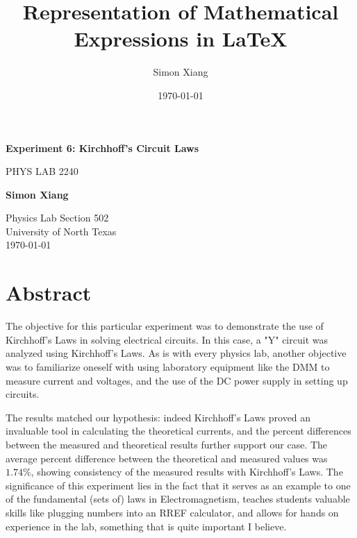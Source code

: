 \documentclass{article}
\title{Representation of Mathematical Expressions in \LaTeX}
\author{Simon Xiang}
\date{\today}
\begin{document}
\begin{titlepage}
    \begin{center}
        \vspace*{1cm}
 
        \Huge
        \textbf{Experiment 6: Kirchhoff's Circuit Laws}
 
        \vspace{0.5cm}
        \LARGE
        PHYS LAB 2240
 
        \vspace{1.5cm}
 
        \textbf{Simon Xiang}
 
        \vfill
  
        \vspace{0.8cm}
 
        \Large
        Physics Lab Section 502\\
        University of North Texas\\
        \today
 
    \end{center}
\end{titlepage}

\section{Abstract}
The objective for this particular experiment was to demonstrate the use of Kirchhoff's Laws in solving electrical circuits.
In this case, a "Y" circuit was analyzed using Kirchhoff's Laws. As is with every physics lab, another objective was to familiarize oneself
with using laboratory equipment like the DMM to measure current and voltages, and the use of the DC power supply in setting up circuits. 

The results matched our hypothesis: indeed Kirchhoff's Laws proved an invaluable tool in calculating the theoretical currents, and the percent differences
between the measured and theoretical results further support our case. The average percent difference between the theoretical and
measured values was $1.74\%$, showing consistency of the measured results with Kirchhoff's Laws. The significance of this experiment lies in 
the fact that it serves as an example to one of the fundamental (sets of) laws in Electromagnetism, teaches students valuable skills like plugging numbers into an RREF calculator,
and allows for hands on experience in the lab, something that is quite important I believe. 
\end{document}

